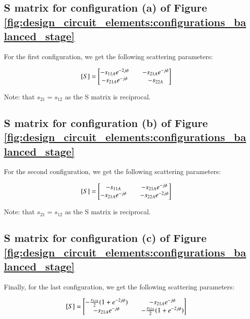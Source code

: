 \documentclass[12pt]{report} %
\begin{document}
\subsection{S matrix for configuration (a) of Figure \ref{fig:design_circuit_elements:configurations_balanced_stage}}

For the first configuration, we get the following scattering parameters:

\[
[S] = \begin{bmatrix}
- s_{11A} \* e^{-2 \* j \* \phi} & \quad - s_{21A} \* e^{- j \* \phi} \\
- s_{21A} \* e^{- j \* \phi} & \quad - s_{22A} \\
\end{bmatrix}
\]

Note: that $s_{21} = s_{12}$ as the S matrix is reciprocal.

\subsection{S matrix for configuration (b) of Figure \ref{fig:design_circuit_elements:configurations_balanced_stage}}

For the second configuration, we get the following scattering parameters:

\[
[S] = \begin{bmatrix}
- s_{11A} & \quad - s_{21A} \* e^{- j \* \phi} \\
- s_{21A} \* e^{- j \* \phi} & \quad - s_{22A} \* e^{-2 \* j \* \phi} \\
\end{bmatrix}
\]

Note: that $s_{21} = s_{12}$ as the S matrix is reciprocal.

\subsection{S matrix for configuration (c) of Figure \ref{fig:design_circuit_elements:configurations_balanced_stage}}

Finally, for the last configuration, we get the following scattering parameters:

\[
[S] = \begin{bmatrix}
- \frac{s_{11A}}{2} \* (1 + e^{-2 \* j \* \phi}) & \quad - s_{21A} \* e^{- j \* \phi} \\
- s_{21A} \* e^{- j \* \phi} & \quad - \frac{s_{22A}}{2} \* (1 + e^{-2 \* j \* \phi}) \\
\end{bmatrix}
\]
\end{document}
